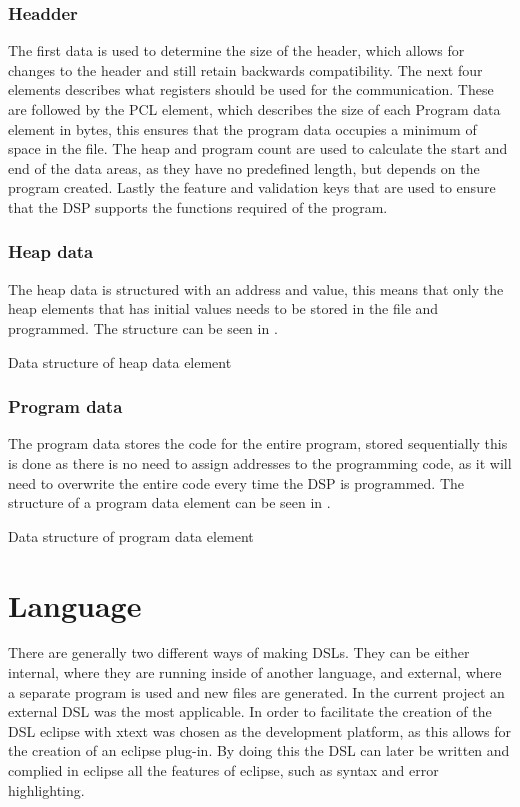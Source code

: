 \subsubsection{Headder}
The first data is used to determine the size of the header, which allows for changes to the header and still retain backwards compatibility. The next four elements describes what registers should be used for the communication. These are followed by the PCL element, which describes the size of each Program data element in bytes, this ensures that the program data occupies a minimum of space in the file. The heap and program count are used to calculate the start and end of the data areas, as they have no predefined length, but depends on the program created. Lastly the feature and validation keys that are used to ensure that the DSP supports the functions required of the program.

\subsubsection{Heap data}
The heap data is structured with an address and value, this means that only the heap elements that has initial values needs to be stored in the file and programmed. The structure can be seen in .
\begin{table}[H]
	\centering
		
		\caption{Data structure of heap data element}
		\label{tab:binheap}
\end{table}
\subsubsection{Program data}
The program data stores the code for the entire program, stored sequentially this is done as there is no need to assign addresses to the programming code, as it will need to overwrite the entire code every time the DSP is programmed. The structure of a program data element can be seen in .
\begin{table}[H]
	\centering
		
		\caption{Data structure of program data element}
		\label{tab:binprogram}
\end{table}

\section{Language}
There are generally two different ways of making DSLs. They can be either internal, where they are running inside of another language, and external, where a separate program is used and new files are generated. In the current project an external DSL was the most applicable. In order to facilitate the creation of the DSL eclipse with xtext was chosen as the development platform, as this allows for the creation of an eclipse plug-in. By doing this the DSL can later be written and complied in eclipse all the features of eclipse, such as syntax and error highlighting.

